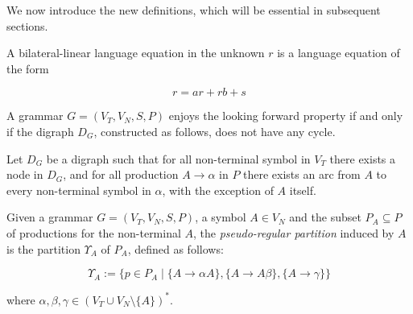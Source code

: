 We now introduce the new definitions, which will be essential in subsequent
sections.

\begin{definition}
	\label{dfn:bl-language-equation}
	A bilateral-linear language equation in the unknown $r$ is a language
	equation of the form

	\begin{equation}
	\label{eqn:ll-rl-language}
	r=ar+rb+s
	\end{equation}
\end{definition}

\begin{definition}
	\label{dfn:looking-forward-property}
	A grammar $G=(V_{T},V_{N},S,P)$ enjoys the looking forward property if and
	only if the digraph $D_{G}$, constructed as follows, does not have any cycle.

	Let $D_{G}$ be a digraph such that for all non-terminal symbol in $V_{T}$
	there exists a node in $D_{G}$, and for all production $A\rightarrow\alpha$
	in $P$ there exists an arc from $A$ to every non-terminal symbol in $\alpha$,
	with the exception of $A$ itself.
\end{definition}

\begin{definition}
	\label{dfn:pseudo-regular-partition}
	Given a grammar $G=(V_{T},V_{N},S,P)$, a symbol $A\in V_{N}$ and the subset
	$P_{A}\subseteq P$ of productions for the non-terminal $A$, the
	\textit{pseudo-regular partition} induced by $A$ is the partition
	$\Upsilon_{A}$ of $P_{A}$, defined as follows:

	\begin{equation}
	\label{eqn:pseudo-regular-partition}
	\Upsilon_{A}:=
	\biggl\{p\in P_{A} \;\bigg|\;
	\{A\rightarrow\alpha A\},
	\{A\rightarrow A\beta\},
	\{A\rightarrow\gamma\}
	\biggl\}
	\end{equation}

	where $\alpha,\beta,\gamma\in\left(V_{T}\cup V_{N}\setminus\{A\}\right)^{*}$.
\end{definition}
